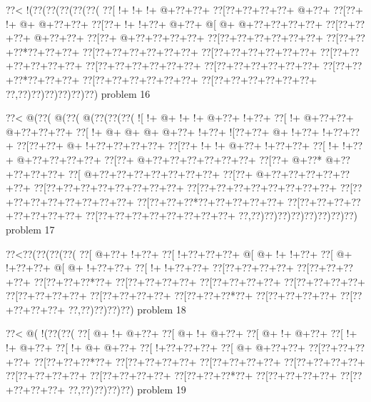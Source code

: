 \vbox{\vbox{\goo
\0??<\- !(\0??(\0??(\0??(\0??(\0??(
\0??[\- !+\- !+\- !+\- @+\0??+\0??+
\0??[\0??+\0??+\0??+\0??+\- @+\0??+
\0??[\0??+\- !+\- @+\- @+\0??+\0??+
\0??[\0??+\- !+\- !+\0??+\- @+\0??+
\- @[\- @+\- @+\0??+\0??+\0??+\0??+
\0??[\0??+\0??+\0??+\- @+\0??+\0??+
\0??[\0??+\- @+\0??+\0??+\0??+\0??+
\0??[\0??+\0??+\0??+\0??+\0??+\0??+
\0??[\0??+\0??+\0??*\0??+\0??+\0??+
\0??[\0??+\0??+\0??+\0??+\0??+\0??+
\0??[\0??+\0??+\0??+\0??+\0??+\0??+
\0??[\0??+\0??+\0??+\0??+\0??+\0??+
\0??[\0??+\0??+\0??+\0??+\0??+\0??+
\0??[\0??+\0??+\0??+\0??+\0??+\0??+
\0??[\0??+\0??+\0??*\0??+\0??+\0??+
\0??[\0??+\0??+\0??+\0??+\0??+\0??+
\0??[\0??+\0??+\0??+\0??+\0??+\0??+
\0??,\0??)\0??)\0??)\0??)\0??)\0??)
}
\hfil problem 16\hfil\break
}

\vbox{\vbox{\goo
\0??<\- @(\0??(\- @(\0??(\- @(\0??(\0??(\0??(
\- ![\- !+\- @+\- !+\- !+\- @+\0??+\- !+\0??+
\0??[\- !+\- @+\0??+\0??+\- @+\0??+\0??+\0??+
\0??[\- !+\- @+\- @+\- @+\- @+\0??+\- !+\0??+
\- ![\0??+\0??+\- @+\- !+\0??+\- !+\0??+\0??+
\0??[\0??+\0??+\- @+\- !+\0??+\0??+\0??+\0??+
\0??[\0??+\- !+\- !+\- @+\0??+\- !+\0??+\0??+
\0??[\- !+\- !+\0??+\- @+\0??+\0??+\0??+\0??+
\0??[\0??+\- @+\0??+\0??+\0??+\0??+\0??+\0??+
\0??[\0??+\- @+\0??*\- @+\0??+\0??+\0??+\0??+
\0??[\- @+\0??+\0??+\0??+\0??+\0??+\0??+\0??+
\0??[\0??+\- @+\0??+\0??+\0??+\0??+\0??+\0??+
\0??[\0??+\0??+\0??+\0??+\0??+\0??+\0??+\0??+
\0??[\0??+\0??+\0??+\0??+\0??+\0??+\0??+\0??+
\0??[\0??+\0??+\0??+\0??+\0??+\0??+\0??+\0??+
\0??[\0??+\0??+\0??*\0??+\0??+\0??+\0??+\0??+
\0??[\0??+\0??+\0??+\0??+\0??+\0??+\0??+\0??+
\0??[\0??+\0??+\0??+\0??+\0??+\0??+\0??+\0??+
\0??,\0??)\0??)\0??)\0??)\0??)\0??)\0??)\0??)
}
\hfil problem 17\hfil\break
}

\vbox{\vbox{\goo
\0??<\0??(\0??(\0??(\0??(
\0??[\- @+\0??+\- !+\0??+
\0??[\- !+\0??+\0??+\0??+
\- @[\- @+\- !+\- !+\0??+
\0??[\- @+\- !+\0??+\0??+
\- @[\- @+\- !+\0??+\0??+
\0??[\- !+\- !+\0??+\0??+
\0??[\0??+\0??+\0??+\0??+
\0??[\0??+\0??+\0??+\0??+
\0??[\0??+\0??+\0??*\0??+
\0??[\0??+\0??+\0??+\0??+
\0??[\0??+\0??+\0??+\0??+
\0??[\0??+\0??+\0??+\0??+
\0??[\0??+\0??+\0??+\0??+
\0??[\0??+\0??+\0??+\0??+
\0??[\0??+\0??+\0??*\0??+
\0??[\0??+\0??+\0??+\0??+
\0??[\0??+\0??+\0??+\0??+
\0??,\0??)\0??)\0??)\0??)
}
\hfil problem 18\hfil\break
}

\vbox{\vbox{\goo
\0??<\- @(\- !(\0??(\0??(
\0??[\- @+\- !+\- @+\0??+
\0??[\- @+\- !+\- @+\0??+
\0??[\- @+\- !+\- @+\0??+
\0??[\- !+\- !+\- @+\0??+
\0??[\- !+\- @+\- @+\0??+
\0??[\- !+\0??+\0??+\0??+
\0??[\- @+\- @+\0??+\0??+
\0??[\0??+\0??+\0??+\0??+
\0??[\0??+\0??+\0??*\0??+
\0??[\0??+\0??+\0??+\0??+
\0??[\0??+\0??+\0??+\0??+
\0??[\0??+\0??+\0??+\0??+
\0??[\0??+\0??+\0??+\0??+
\0??[\0??+\0??+\0??+\0??+
\0??[\0??+\0??+\0??*\0??+
\0??[\0??+\0??+\0??+\0??+
\0??[\0??+\0??+\0??+\0??+
\0??,\0??)\0??)\0??)\0??)
}
\hfil problem 19\hfil\break
}

